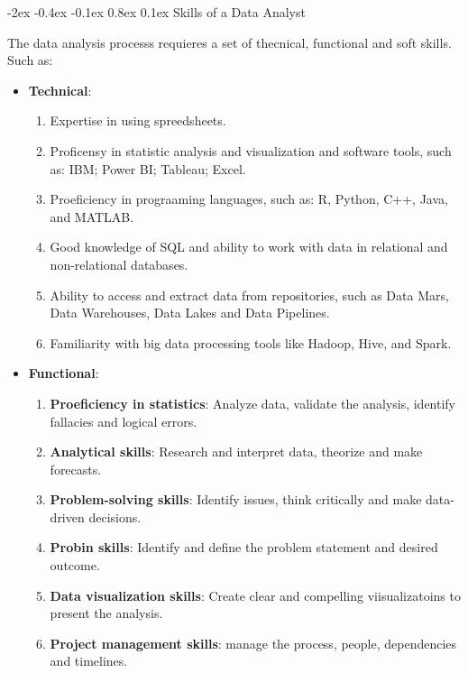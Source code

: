 \documentclass[12pt]{report}
\makeatletter
\renewcommand{\subsection}{\@startsection{subsection}{2}{\z@}%
  {-2ex \@plus -0.4ex \@minus -0.1ex}%
  {0.8ex \@plus 0.1ex}%
  {\normalfont\large\subsectionstyle}}
\newcommand{\subsectionstyle}[1]{%
  \par\noindent\hrule
  \vspace{-0.4ex}%
  {\scshape #1\par}%
  \vspace{0.4ex}%
  \hrule
}
\theoremstyle{largebreak}
\makeatother
\begin{document}
    \subsection{Skills of a Data Analyst}

    The data analysis processs requieres a set of thecnical, functional and soft skills. Such as:
    \begin{itemize}
        \item \textbf{Technical}:
        \begin{enumerate}[label = \textit{(\arabic*)}]
            \item Expertise in using spreedsheets.
            \item Proficensy in statistic analysis and visualization and software tools, such as: IBM; Power  BI; Tableau; Excel.
            \item Proeficiency in prograaming languages, such as: R, Python, C++, Java, and MATLAB.
            \item Good knowledge of SQL and ability to work with data in relational and non-relational databases.
            \item Ability to access and extract data from repositories, such as Data Mars, Data Warehouses, Data Lakes and Data Pipelines.
            \item Familiarity with big data processing tools like Hadoop, Hive, and Spark.
        \end{enumerate}
        \item \textbf{Functional}:
        \begin{enumerate}[label = \textit{(\arabic*)}]
            \item \textbf{Proeficiency in statistics}: Analyze data, validate the analysis, identify fallacies and logical errors.
            \item \textbf{Analytical skills}: Research and interpret data, theorize and make forecasts.
            \item \textbf{Problem-solving skills}: Identify issues, think critically and make data-driven decisions.
            \item \textbf{Probin skills}: Identify and define the problem statement and desired outcome.
            \item \textbf{Data visualization skills}: Create clear and compelling viisualizatoins to present the analysis.
            \item \textbf{Project management skills}: manage the process, people, dependencies and timelines.
        \end{enumerate}

\end{itemize}
\end{document}

